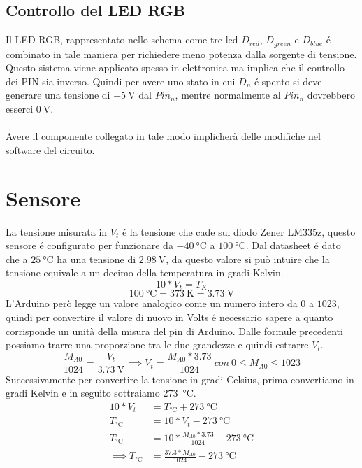 \documentclass[a4paper]{article}
\begin{document}
	\subsection{Controllo del LED RGB}
	Il LED RGB, rappresentato nello schema come tre led $D_{red}$, $D_{green}$ e $D_{blue}$
	é combinato in tale maniera per richiedere meno potenza dalla sorgente di tensione.
	Questo sistema viene applicato spesso in elettronica ma implica che il controllo dei PIN sia
	inverso. Quindi per avere uno stato in cui $D_n$ é spento si deve generare una tensione
	di $\SI{-5}{\volt}$ dal $Pin_n$, mentre normalmente al $Pin_n$ dovrebbero esserci 
	$\SI{0}{\volt}$.\\\\
	Avere il componente collegato in tale modo implicherà delle modifiche nel software
	del circuito.
	
	\section{Sensore}
	La tensione misurata in $V_t$ é la tensione che cade sul diodo Zener LM335z, questo
	sensore é configurato per funzionare da $\SI{-40}{\celsius}$ a $\SI{+100}{\celsius}$.
	Dal datasheet é dato che a $\SI{+25}{\celsius}$ ha una tensione di $\SI{2,98}{\volt}$,
	da questo valore si può intuire che la tensione equivale a un decimo della temperatura
	in gradi Kelvin.
	$$10 * V_t = T_K$$
	$$\SI{100}{\celsius} = \SI{373}{\kelvin} = \SI{3.73}{\volt}$$
	L'Arduino però legge un valore analogico come un numero intero da $0$ a $1023$, quindi per
	convertire il valore di nuovo in Volts é necessario sapere a quanto corrisponde un unità
	della misura del pin di Arduino. Dalle formule precedenti possiamo trarre una proporzione
	tra le due grandezze e quindi estrarre $V_t$.
	$$\frac{M_{A0}}{1024} = \frac{V_t}{\SI{3.73}{\volt}} \implies V_t = \frac{M_{A0} * 3.73}{1024}
	~con~0\leq M_{A0} \leq 1023$$
	Successivamente per convertire la tensione in gradi Celsius, prima convertiamo in gradi Kelvin
	e in seguito sottraiamo \SI{273}{\celsius}. 
	\begin{align*}
		10 * V_t &= T_{\si{\celsius}} + \SI{273}{\celsius}\\
		T_{\si{\celsius}} &= 10 * V_t - \SI{273}{\celsius}\\
		T_{\si{\celsius}} &= 10 * \frac{M_{A0} * 3.73}{1024} - \SI{273}{\celsius}\\
		\implies T_{\si{\celsius}} &= \frac{37.3*M_{A0}}{1024} - \SI{273}{\celsius}
	\end{align*}
	
\end{document}
